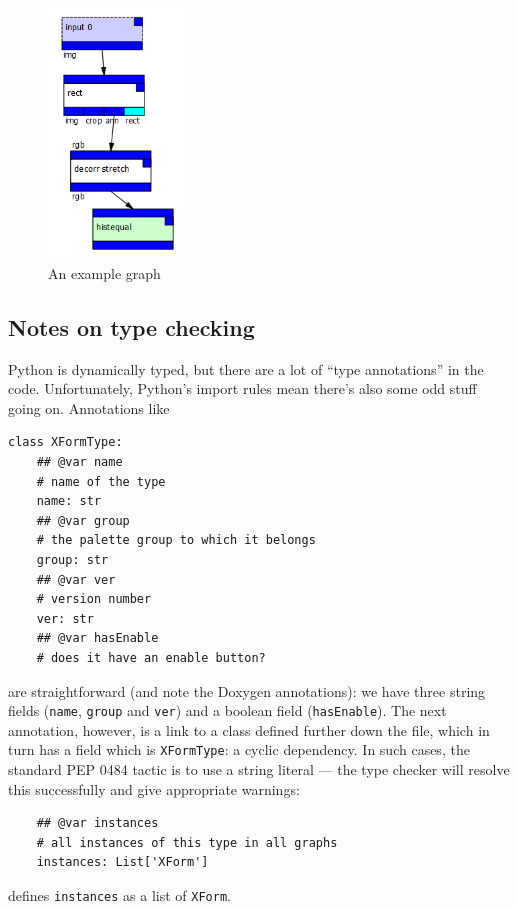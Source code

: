\begin{figure}[ht]
\center
\includegraphics[width=1.4in]{graph.png}
\caption{An example graph}
\label{graph.png}
\end{figure}


\subsection{Notes on type checking}
Python is dynamically typed, but there are a lot of ``type annotations''
in the code. Unfortunately, Python's import rules mean there's also some
odd stuff going on. Annotations like
\begin{lstlisting}
class XFormType:
    ## @var name
    # name of the type
    name: str
    ## @var group
    # the palette group to which it belongs
    group: str
    ## @var ver
    # version number
    ver: str
    ## @var hasEnable
    # does it have an enable button?
\end{lstlisting}
are straightforward (and note the Doxygen annotations): we have three
string fields (\texttt{name}, \texttt{group} and \texttt{ver}) and
a boolean field (\texttt{hasEnable}). The next annotation, however,
is a link to a class defined further down the file, which in turn has
a field which is \texttt{XFormType}: a cyclic dependency. In such cases,
the standard PEP 0484 tactic is to use a string literal --- the type
checker will resolve this successfully and give appropriate warnings:
\begin{lstlisting}
    ## @var instances
    # all instances of this type in all graphs
    instances: List['XForm']
\end{lstlisting}
defines \texttt{instances} as a list of \texttt{XForm}.

